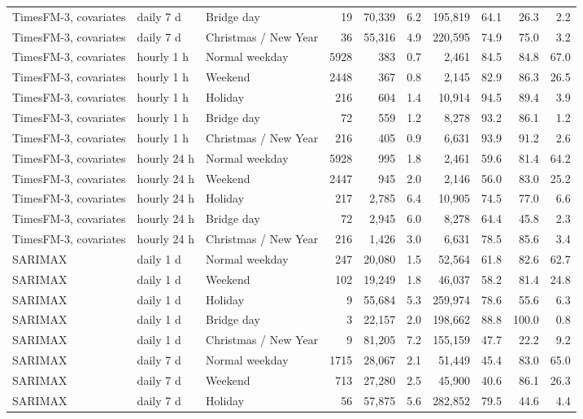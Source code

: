 \begin{tabular}{lllrrrrrrr}
TimesFM-3, covariates & daily 7 d & Bridge day & 19 & 70,339 & 6.2 & 195,819 & 64.1 & 26.3 & 2.2 \\
TimesFM-3, covariates & daily 7 d & Christmas / New Year & 36 & 55,316 & 4.9 & 220,595 & 74.9 & 75.0 & 3.2 \\
TimesFM-3, covariates & hourly 1 h & Normal weekday & 5928 & 383 & 0.7 & 2,461 & 84.5 & 84.8 & 67.0 \\
TimesFM-3, covariates & hourly 1 h & Weekend & 2448 & 367 & 0.8 & 2,145 & 82.9 & 86.3 & 26.5 \\
TimesFM-3, covariates & hourly 1 h & Holiday & 216 & 604 & 1.4 & 10,914 & 94.5 & 89.4 & 3.9 \\
TimesFM-3, covariates & hourly 1 h & Bridge day & 72 & 559 & 1.2 & 8,278 & 93.2 & 86.1 & 1.2 \\
TimesFM-3, covariates & hourly 1 h & Christmas / New Year & 216 & 405 & 0.9 & 6,631 & 93.9 & 91.2 & 2.6 \\
TimesFM-3, covariates & hourly 24 h & Normal weekday & 5928 & 995 & 1.8 & 2,461 & 59.6 & 81.4 & 64.2 \\
TimesFM-3, covariates & hourly 24 h & Weekend & 2447 & 945 & 2.0 & 2,146 & 56.0 & 83.0 & 25.2 \\
TimesFM-3, covariates & hourly 24 h & Holiday & 217 & 2,785 & 6.4 & 10,905 & 74.5 & 77.0 & 6.6 \\
TimesFM-3, covariates & hourly 24 h & Bridge day & 72 & 2,945 & 6.0 & 8,278 & 64.4 & 45.8 & 2.3 \\
TimesFM-3, covariates & hourly 24 h & Christmas / New Year & 216 & 1,426 & 3.0 & 6,631 & 78.5 & 85.6 & 3.4 \\
SARIMAX & daily 1 d & Normal weekday & 247 & 20,080 & 1.5 & 52,564 & 61.8 & 82.6 & 62.7 \\
SARIMAX & daily 1 d & Weekend & 102 & 19,249 & 1.8 & 46,037 & 58.2 & 81.4 & 24.8 \\
SARIMAX & daily 1 d & Holiday & 9 & 55,684 & 5.3 & 259,974 & 78.6 & 55.6 & 6.3 \\
SARIMAX & daily 1 d & Bridge day & 3 & 22,157 & 2.0 & 198,662 & 88.8 & 100.0 & 0.8 \\
SARIMAX & daily 1 d & Christmas / New Year & 9 & 81,205 & 7.2 & 155,159 & 47.7 & 22.2 & 9.2 \\
SARIMAX & daily 7 d & Normal weekday & 1715 & 28,067 & 2.1 & 51,449 & 45.4 & 83.0 & 65.0 \\
SARIMAX & daily 7 d & Weekend & 713 & 27,280 & 2.5 & 45,900 & 40.6 & 86.1 & 26.3 \\
SARIMAX & daily 7 d & Holiday & 56 & 57,875 & 5.6 & 282,852 & 79.5 & 44.6 & 4.4 \\

\end{tabular}
